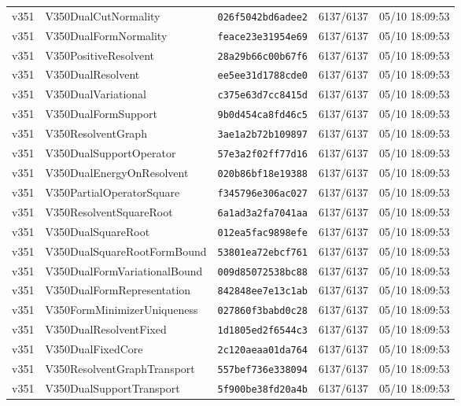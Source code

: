 \documentclass[11pt]{article}
\theoremstyle{definition}\newtheorem{deriv}{Derivation}
\begin{document}
{\begin{longtable}{@{}lllll@{}}
v351 & V350DualCutNormality & \texttt{026f5042bd6adee2} & 6137/6137 & 05/10 18:09:53 \\
v351 & V350DualFormNormality & \texttt{feace23e31954e69} & 6137/6137 & 05/10 18:09:53 \\
v351 & V350PositiveResolvent & \texttt{28a29b66c00b67f6} & 6137/6137 & 05/10 18:09:53 \\
v351 & V350DualResolvent & \texttt{ee5ee31d1788cde0} & 6137/6137 & 05/10 18:09:53 \\
v351 & V350DualVariational & \texttt{c375e63d7cc8415d} & 6137/6137 & 05/10 18:09:53 \\
v351 & V350DualFormSupport & \texttt{9b0d454ca8fd46c5} & 6137/6137 & 05/10 18:09:53 \\
v351 & V350ResolventGraph & \texttt{3ae1a2b72b109897} & 6137/6137 & 05/10 18:09:53 \\
v351 & V350DualSupportOperator & \texttt{57e3a2f02ff77d16} & 6137/6137 & 05/10 18:09:53 \\
v351 & V350DualEnergyOnResolvent & \texttt{020b86bf18e19388} & 6137/6137 & 05/10 18:09:53 \\
v351 & V350PartialOperatorSquare & \texttt{f345796e306ac027} & 6137/6137 & 05/10 18:09:53 \\
v351 & V350ResolventSquareRoot & \texttt{6a1ad3a2fa7041aa} & 6137/6137 & 05/10 18:09:53 \\
v351 & V350DualSquareRoot & \texttt{012ea5fac9898efe} & 6137/6137 & 05/10 18:09:53 \\
v351 & V350DualSquareRootFormBound & \texttt{53801ea72ebcf761} & 6137/6137 & 05/10 18:09:53 \\
v351 & V350DualFormVariationalBound & \texttt{009d85072538bc88} & 6137/6137 & 05/10 18:09:53 \\
v351 & V350DualFormRepresentation & \texttt{842848ee7e13c1ab} & 6137/6137 & 05/10 18:09:53 \\
v351 & V350FormMinimizerUniqueness & \texttt{027860f3babd0c28} & 6137/6137 & 05/10 18:09:53 \\
v351 & V350DualResolventFixed & \texttt{1d1805ed2f6544c3} & 6137/6137 & 05/10 18:09:53 \\
v351 & V350DualFixedCore & \texttt{2c120aeaa01da764} & 6137/6137 & 05/10 18:09:53 \\
v351 & V350ResolventGraphTransport & \texttt{557bef736e338094} & 6137/6137 & 05/10 18:09:53 \\
v351 & V350DualSupportTransport & \texttt{5f900be38fd20a4b} & 6137/6137 & 05/10 18:09:53 \\

\end{longtable}}
\end{document}
